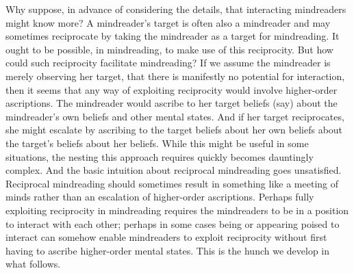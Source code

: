 \documentclass[12pt,a4paper]{extarticle}
\begin{document}
Why suppose, in advance of considering the details, that interacting mindreaders might know more?
A mindreader's target is often also a mindreader and may sometimes reciprocate by taking the mindreader as a target for mindreading.
It ought to be possible, in mindreading, to make use of this reciprocity.
But how could such reciprocity facilitate mindreading?
If we assume the mindreader is merely observing her target,
that there is manifestly no potential for interaction,
then it seems that any way of exploiting reciprocity would involve higher-order ascriptions. 
The mindreader would ascribe to her target beliefs (say) about the mindreader's own beliefs and other mental states.
And if her target reciprocates, she might escalate by ascribing to the target beliefs about her own beliefs about the target's beliefs about her beliefs.
While this might be useful in some situations, 
the nesting this approach requires quickly becomes dauntingly complex.
And the basic intuition about reciprocal mindreading goes unsatisfied.
Reciprocal mindreading should sometimes result in 
something like a meeting of minds
rather than
an escalation of higher-order ascriptions.
Perhaps fully exploiting reciprocity in mindreading
requires the mindreaders to be in a position to interact with each other;
perhaps in some cases 
being or appearing poised to interact
can somehow enable mindreaders to exploit reciprocity without first having to ascribe higher-order mental states.
This is the hunch we develop in what follows.
\end{document}
